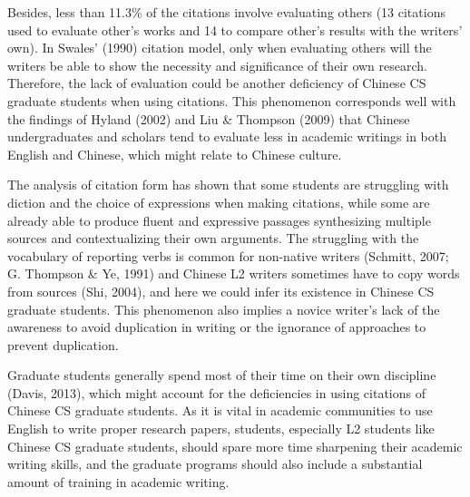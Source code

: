 Besides, less than 11.3\% of the citations involve evaluating others (13 citations used to evaluate other’s works and 14 to compare other’s results with the writers’ own). In Swales’ (1990) citation model, only when evaluating others will the writers be able to show the necessity and significance of their own research. Therefore, the lack of evaluation could be another deficiency of Chinese CS graduate students when using citations. This phenomenon corresponds well with the findings of Hyland (2002) and Liu \& Thompson (2009) that Chinese undergraduates and scholars tend to evaluate less in academic writings in both English and Chinese, which might relate to Chinese culture.

The analysis of citation form has shown that some students are struggling with diction and the choice of expressions when making citations, while some are already able to produce fluent and expressive passages synthesizing multiple sources and contextualizing their own arguments. The struggling with the vocabulary of reporting verbs is common for non-native writers (Schmitt, 2007; G. Thompson \& Ye, 1991) and Chinese L2 writers sometimes have to copy words from sources (Shi, 2004), and here we could infer its existence in Chinese CS graduate students. This phenomenon also implies a novice writer’s lack of the awareness to avoid duplication in writing or the ignorance of approaches to prevent duplication.

Graduate students generally spend most of their time on their own discipline (Davis, 2013), which might account for the deficiencies in using citations of Chinese CS graduate students. As it is vital in academic communities to use English to write proper research papers, students, especially L2 students like Chinese CS graduate students, should spare more time sharpening their academic writing skills, and the graduate programs should also include a substantial amount of training in academic writing.